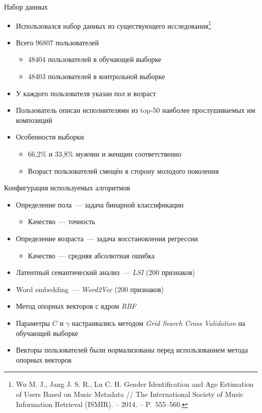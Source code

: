 \documentclass{beamer}
\begin{document}
\begin{frame}{Набор данных}
    \begin{itemize}
        \item {Использовался набор данных из существующего 
              исследования\footnote{Wu M. J.,
              Jang J. S. R., Lu C. H. Gender Identification
              and Age Estimation of Users Based on Music 
              Metadata // The International Society of Music Information Retrieval (ISMIR). – 2014. – P.~555--560.}}
        \item {Всего $96807$ пользователей}
            \begin{itemize}
                \item {48404 пользователей в обучающей выборке}
                \item {48403 пользователей в контрольной выборке}
            \end{itemize}
        \item {У каждого пользователя указан пол и возраст}
        \item {Пользователь описан исполнителями из top-50 наиболее
            прослушиваемых им композиций}
        \item {Особенности выборки}
            \begin{itemize}
                \item {66{,}2\% и 33{,}8\% мужчин и женщин соответственно}
                \item {Возраст пользователей смещён в сторону молодого поколения}
            \end{itemize}
    \end{itemize}
\end{frame}

\begin{frame}{Конфигурация используемых алгоритмов}
  \begin{itemize}
      \item {Определение пола~--- задача бинарной классификации}
          \begin{itemize}
              \item {Качество~--- точность}
          \end{itemize}
      \item {Определение возраста~--- задача восстановления регрессии}
          \begin{itemize}
              \item {Качество~--- средняя абсолютная ошибка}
          \end{itemize}
      \item {Латентный семантический анализ~--- \textit{LSI} (200 признаков)}
      \item {Word embedding~--- \textit{Word2Vec} (200 признаков)}
      \item {Метод опорных векторов с ядром \textit{RBF}}
      \item {Параметры $C$ и $\gamma$ настраивались методом \textit{Grid Search Cross Validation} на обучающей выборке}
      \item {Векторы пользователей были нормализованы перед использованием метода опорных векторов}
  \end{itemize}
\end{frame}
\end{document}
